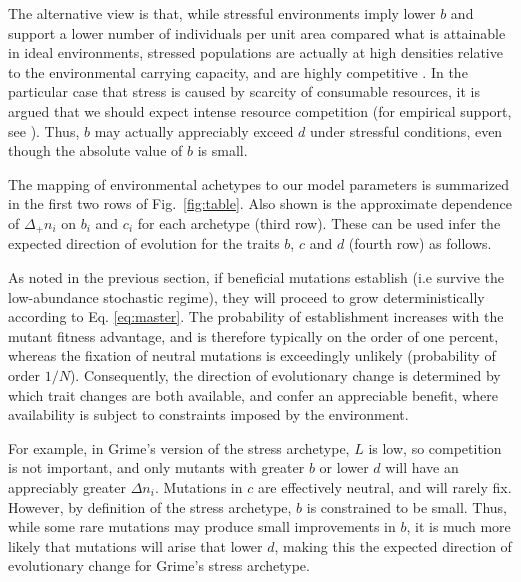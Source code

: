 \documentclass[11pt]{article}
\begin{document}
The alternative view is that, while stressful environments imply lower $b$ and support a lower number of individuals per unit area compared what is attainable in ideal environments, stressed populations are actually at high densities relative to the environmental carrying capacity, and are highly competitive \citep{taylor_1990}. In the particular case that stress is caused by scarcity of consumable resources, it is argued that we should expect intense resource competition (for empirical support, see \citealt{davis_1998}). Thus, $b$ may actually appreciably exceed $d$ under stressful conditions, even though the absolute value of $b$ is small. 

The mapping of environmental achetypes to our model parameters is summarized in the first two rows of Fig.~\ref{fig:table}. Also shown is the approximate dependence of $\Delta_+ n_i$ on $b_i$ and $c_i$ for each archetype (third row). These can be used infer the expected direction of evolution for the traits $b$, $c$ and $d$ (fourth row) as follows. 

As noted in the previous section, if beneficial mutations establish (i.e survive the low-abundance stochastic regime), they will proceed to grow deterministically according to Eq. \eqref{eq:master}. The probability of establishment increases with the mutant fitness advantage, and is therefore typically on the order of one percent, whereas the fixation of neutral mutations is exceedingly unlikely (probability of order $1/N$). Consequently, the direction of evolutionary change is determined by which trait changes are both available, and confer an appreciable benefit, where availability is subject to constraints imposed by the environment. 

For example, in Grime's version of the stress archetype, $L$ is low, so competition is not important, and only mutants with greater $b$ or lower $d$ will have an appreciably greater $\Delta n_i$. Mutations in $c$ are effectively neutral, and will rarely fix. However, by definition of the stress archetype, $b$ is constrained to be small. Thus, while some rare mutations may produce small improvements in $b$, it is much more likely that mutations will arise that lower $d$, making this the expected direction of evolutionary change for Grime's stress archetype. 
\end{document}
